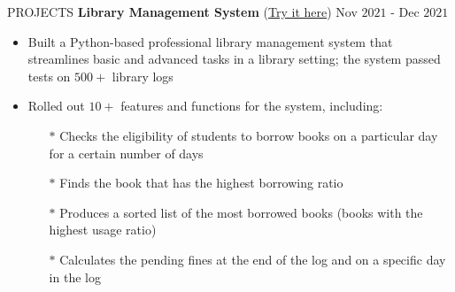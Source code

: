 \documentclass{resume} %
\begin{document}
\begin{rSection}{PROJECTS}
\textbf{Library Management System }{(\href{https://github.com/harshitjain17/Library-Management-System}{Try it here})} \hfill Nov $2021$ - Dec $2021$
\begin{itemize}[itemsep = -4pt]
    \item Built a Python-based professional library management system that streamlines basic and advanced tasks in a library setting; the system passed tests on $500+$ library logs
    \item Rolled out $10+$ features and functions for the system, including:
    \begin{itemize}[itemsep = -4pt]
        \item[$*$] Checks the eligibility of students to borrow books on a particular day for a certain number of days
        \item[$*$] Finds the book that has the highest borrowing ratio
        \item[$*$] Produces a sorted list of the most borrowed books (books with the highest usage ratio)
        \item[$*$] Calculates the pending fines at the end of the log and on a specific day in the log
    \end{itemize}
\end{itemize}

\end{rSection} 



 
\end{document}

